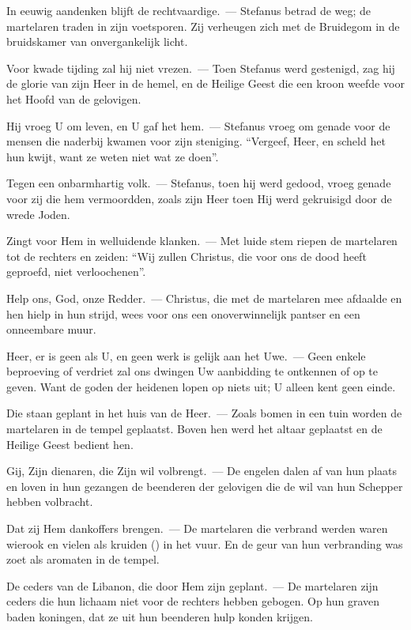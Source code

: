 \documentclass[12pt,twoside,a5paper]{article}
\begin{document}
\begin{halfparskip}
  In eeuwig aandenken blijft de rechtvaardige.~--- Stefanus betrad de weg; de martelaren traden in zijn voetsporen. Zij verheugen zich met de Bruidegom in de bruidskamer van onvergankelijk licht.

  Voor kwade tijding zal hij niet vrezen.~--- Toen Stefanus werd gestenigd, zag hij de glorie van zijn Heer in de hemel, en de Heilige Geest die een kroon weefde voor het Hoofd van de gelovigen.

  Hij vroeg U om leven, en U gaf het hem.~--- Stefanus vroeg om genade voor de mensen die naderbij kwamen voor zijn steniging. ``Vergeef, Heer, en scheld het hun kwijt, want ze weten niet wat ze doen''.

  Tegen een onbarmhartig volk.~--- Stefanus, toen hij werd gedood, vroeg genade voor zij die hem vermoordden, zoals zijn Heer toen Hij werd gekruisigd door de wrede Joden.

  Zingt voor Hem in welluidende klanken.~--- Met luide stem riepen de martelaren tot de rechters en zeiden: ``Wij zullen Christus, die voor ons de dood heeft geproefd, niet verloochenen''.

  Help ons, God, onze Redder.~--- Christus, die met de martelaren mee afdaalde en hen hielp in hun strijd, wees voor ons een onoverwinnelijk pantser en een onneembare muur.

  Heer, er is geen als U, en geen werk is gelijk aan het Uwe.~--- Geen enkele beproeving of verdriet zal ons dwingen Uw aanbidding te ontkennen of op te geven. Want de goden der heidenen lopen op niets uit; U alleen kent geen einde.

  Die staan geplant in het huis van de Heer.~--- Zoals bomen in een tuin worden de martelaren in de tempel geplaatst. Boven hen werd het altaar geplaatst en de Heilige Geest bedient hen.

  Gij, Zijn dienaren, die Zijn wil volbrengt.~--- De engelen dalen af van hun plaats en loven in hun gezangen de beenderen der gelovigen die de wil van hun Schepper hebben volbracht.

  Dat zij Hem dankoffers brengen.~--- De martelaren die verbrand werden waren wierook en vielen als kruiden () in het vuur. En de geur van hun verbranding was zoet als aromaten in de tempel.

  De ceders van de Libanon, die door Hem zijn geplant.~--- De martelaren zijn ceders die hun lichaam niet voor de rechters hebben gebogen. Op hun graven baden koningen, dat ze uit hun beenderen hulp konden krijgen.


\end{halfparskip}
\end{document}

